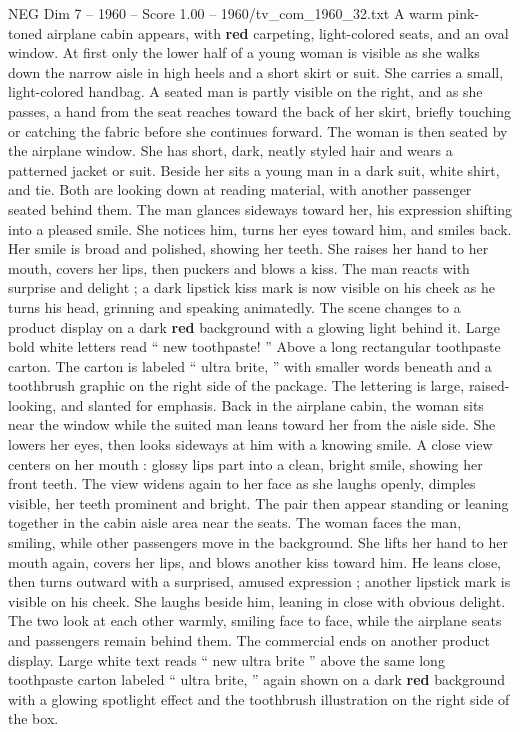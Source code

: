 \begin{textsample}{NEG Dim 7 – 1960 – Score 1.00 – 1960/tv\_com\_1960\_32.txt}  \label{ex:f7_neg_078}
A warm pink-toned airplane cabin appears, with \textbf{red} carpeting, light-colored seats, and an oval window.
At first only the lower half of a young woman is visible as she walks down the narrow aisle in high heels and a short skirt or suit.
She carries a small, light-colored handbag.
A seated man is partly visible on the right, and as she passes, a hand from the seat reaches toward the back of her skirt, briefly touching or catching the fabric before she continues forward.
The woman is then seated by the airplane window.
She has short, dark, neatly styled hair and wears a patterned jacket or suit.
Beside her sits a young man in a dark suit, white shirt, and tie.
Both are looking down at reading material, with another passenger seated behind them.
The man glances sideways toward her, his expression shifting into a pleased smile.
She notices him, turns her eyes toward him, and smiles back.
Her smile is broad and polished, showing her teeth.
She raises her hand to her mouth, covers her lips, then puckers and blows a kiss.
The man reacts with surprise and delight ; a dark lipstick kiss mark is now visible on his cheek as he turns his head, grinning and speaking animatedly.
The scene changes to a product display on a dark \textbf{red} background with a glowing light behind it.
Large bold white letters read “ new toothpaste! ” Above a long rectangular toothpaste carton.
The carton is labeled “ ultra brite, ” with smaller words beneath and a toothbrush graphic on the right side of the package.
The lettering is large, raised-looking, and slanted for emphasis.
Back in the airplane cabin, the woman sits near the window while the suited man leans toward her from the aisle side.
She lowers her eyes, then looks sideways at him with a knowing smile.
A close view centers on her mouth : glossy lips part into a clean, bright smile, showing her front teeth.
The view widens again to her face as she laughs openly, dimples visible, her teeth prominent and bright.
The pair then appear standing or leaning together in the cabin aisle area near the seats.
The woman faces the man, smiling, while other passengers move in the background.
She lifts her hand to her mouth again, covers her lips, and blows another kiss toward him.
He leans close, then turns outward with a surprised, amused expression ; another lipstick mark is visible on his cheek.
She laughs beside him, leaning in close with obvious delight.
The two look at each other warmly, smiling face to face, while the airplane seats and passengers remain behind them.
The commercial ends on another product display.
Large white text reads “ new ultra brite ” above the same long toothpaste carton labeled “ ultra brite, ” again shown on a dark \textbf{red} background with a glowing spotlight effect and the toothbrush illustration on the right side of the box.

\end{textsample}
